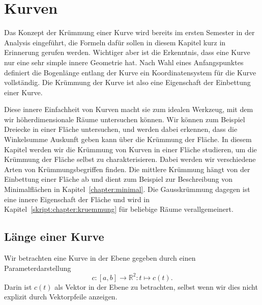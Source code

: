 %
%
%
\chapter{Kurven%
\label{skript:chapter:kurven}}
\rhead{}
Das Konzept der Krümmung einer Kurve wird bereits im ersten Semester
in der Analysis eingeführt,
die Formeln dafür sollen in diesem Kapitel kurz in Erinnerung gerufen werden.
Wichtiger aber ist die Erkenntnis, dass eine Kurve nur eine sehr simple
innere Geometrie hat.
Nach Wahl eines Anfangspunktes definiert die Bogenlänge entlang der Kurve 
ein Koordinatensystem für die Kurve vollständig.
Die Krümmung der Kurve ist also eine Eigenschaft der Einbettung einer Kurve.

Diese innere Einfachheit von Kurven macht sie zum idealen Werkzeug, mit
dem wir höher\-dimensionale Räume untersuchen können.
Wir können zum Beispiel Dreiecke in einer Fläche untersuchen,
und werden dabei erkennen, dass die Winkelsumme Auskunft geben kann
über die Krümmung der Fläche.
In diesem Kapitel werden wir die Krümmung von Kurven in einer Fläche
studieren, um die Krümmung der Fläche selbst zu charakterisieren.
Dabei werden wir verschiedene Arten von Krümmungsbegriffen finden.
Die mittlere Krümmung hängt von der Einbettung einer Fläche ab und
dient zum Beispiel zur Beschreibung von Minimalflächen in
Kapitel~\ref{chapter:minimal}.
Die Gausskrümmung dagegen ist eine innere Eigenschaft der Fläche und
wird in Kapitel~\ref{skript:chapter:kruemmung} für beliebige Räume
verallgemeinert.

\section{Länge einer Kurve}
Wir betrachten eine Kurve in der Ebene gegeben durch einen Parameterdarstellung
\[
c\colon [a,b] \to\mathbb R^2:t\mapsto c(t).
\]
Darin ist $c(t)$ als Vektor in der Ebene zu betrachten, selbst wenn
wir dies nicht explizit durch Vektorpfeile anzeigen.

